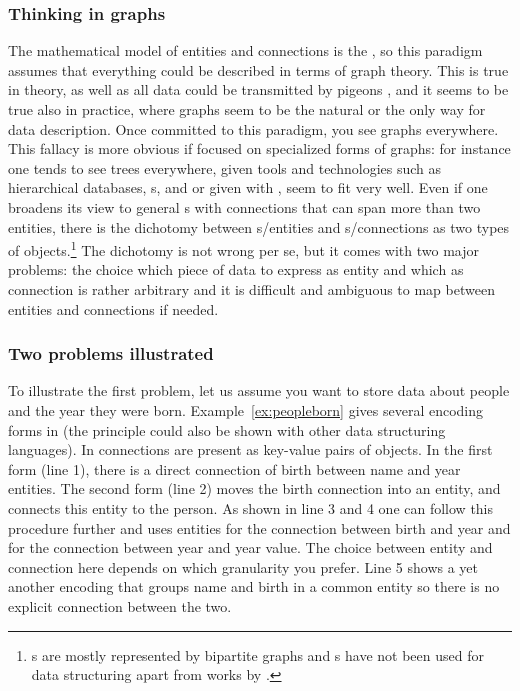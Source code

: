\subsubsection{Thinking in graphs}

The mathematical model of entities and connections is the , so this
paradigm assumes that everything could be described in terms of graph theory.
This is true in theory, as well as all data could be transmitted by pigeons
\cite{Waitzman1990}, and it seems to be true also in practice, where
graphs seem to be the natural or the only way for data description.  Once
committed to this paradigm, you see graphs everywhere. This fallacy is more
obvious if focused on specialized forms of graphs: for instance one tends to
see trees everywhere, given tools and technologies such as hierarchical
databases, s, and  or given  with ,  seem to fit very well. 
Even if one broadens its view to general s with connections
that can span more than two entities, there is the dichotomy between
s/entities and s/connections as two types of
objects.\footnote{s are mostly represented by bipartite graphs
and s have not been used for data structuring
apart from works by \textcite{Goertzel2006}.} The dichotomy is not wrong per
se, but it comes with two major problems: the choice which piece of data
to express as entity and which as connection is rather arbitrary and it is
difficult and ambiguous to map between entities and connections if needed.

\subsubsection{Two problems illustrated}

To illustrate the first problem, let us assume you want to store data about
people and the year they were born. Example~\ref{ex:peopleborn} gives several
encoding forms in  (the principle could also be shown with other
data structuring languages). In  connections are present as key-value
pairs of objects. In the first form (line 1), there is a direct connection of
birth between name and year entities. The second form (line 2) moves the birth
connection into an entity, and connects this entity to the person. As shown in
line 3 and 4 one can follow this procedure further and uses entities for the
connection between birth and year and for the connection between year and year
value. The choice between entity and connection here depends on which
granularity you prefer. Line 5 shows a yet another encoding that groups name
and birth in a common entity so there is no explicit connection between the
two.

